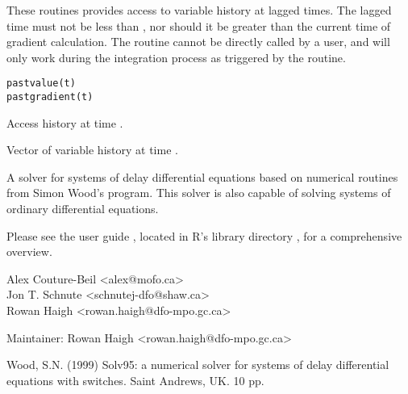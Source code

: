 \documentclass[letterpaper]{book}
\begin{document}
%
\begin{Description}\relax
These routines provides access to variable history at lagged times.
The lagged time  must not be less than , nor
should it be greater than the current time of gradient calculation.
The routine cannot be directly called by a user, and will only work
during the integration process as triggered by the  routine.
\end{Description}
%
\begin{Usage}
\begin{verbatim}
pastvalue(t)
pastgradient(t)
\end{verbatim}
\end{Usage}
%
\begin{Arguments}
\begin{ldescription}
\item[\code{t}] Access history at time .
\end{ldescription}
\end{Arguments}
%
\begin{Value}
Vector of variable history at time .
\end{Value}
%
\begin{SeeAlso}\relax
{}
\end{SeeAlso}
%
\begin{Description}\relax
A solver for systems of delay differential equations based on 
numerical routines from Simon Wood's  program. 
This solver is also capable of solving systems of ordinary
differential equations.
\end{Description}
%
\begin{Details}\relax
Please see the user guide , located in R's
library directory , for a 
comprehensive overview.
\end{Details}
%
\begin{Author}\relax
Alex Couture-Beil <alex@mofo.ca> \\{}
Jon T. Schnute <schnutej-dfo@shaw.ca> \\{}
Rowan Haigh <rowan.haigh@dfo-mpo.gc.ca>

Maintainer: Rowan Haigh <rowan.haigh@dfo-mpo.gc.ca>
\end{Author}
%
\begin{References}\relax
Wood, S.N. (1999) Solv95: a numerical solver for systems of delay 
differential equations with switches. Saint Andrews, UK. 10 pp.

\end{References}
%
\begin{SeeAlso}\relax
{}
\end{SeeAlso}
\printindex{}
\end{document}
